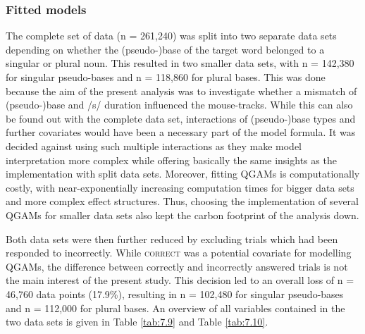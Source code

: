\subsubsection{Fitted models}\label{section07_2_3_1}

The complete set of data (n = 261,240) was split into two separate data sets depending on whether the (pseudo-)base of the target word belonged to a singular or plural noun. This resulted in two smaller data sets, with n = 142,380 for singular pseudo-bases and n = 118,860 for plural bases. This was done because the aim of the present analysis was to investigate whether a mismatch of (pseudo-)base and /s/ duration influenced the mouse-tracks. While this can also be found out with the complete data set, interactions of (pseudo-)base types and further covariates would have been a necessary part of the model formula. It was decided against using such multiple interactions as they make model interpretation more complex while offering basically the same insights as the implementation with split data sets. Moreover, fitting QGAMs is computationally costly, with near-exponentially increasing computation times for bigger data sets and more complex effect structures. Thus, choosing the implementation of several QGAMs for smaller data sets also kept the carbon footprint of the analysis down.

Both data sets were then further reduced by excluding trials which had been responded to incorrectly. While \textsc{correct} was a potential covariate for modelling QGAMs, the difference between correctly and incorrectly answered trials is not the main interest of the present study. This decision led to an overall loss of n = 46,760 data points (17.9\%), resulting in n = 102,480 for singular pseudo-bases and n = 112,000 for plural bases. An overview of all variables contained in the two data sets is given in Table \ref{tab:7.9} and Table \ref{tab:7.10}.


